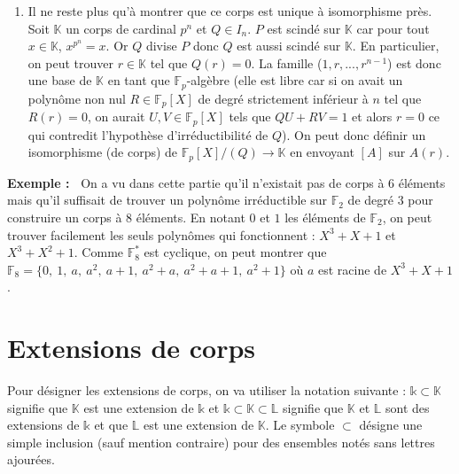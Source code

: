 \documentclass[5pt,a4paper]{article}
\newcommand{\ex}[1]{\textbf{Exemple :~} #1 \newline}
\begin{document}
\begin{onehalfspacing}
{\begin{enumerate}
\[\sum_{d=1}^{n-1}dm^{d-1} = \frac{1 + (n-1)m^n - nm^{n-1}}{(1-m)^2}\]
donc
\[p^n - \sum_{d=1}^{n-1}dp^{d-1} = \frac{n(p^n - p^{n-1}) + p^n((1-p^2) - 1) - 1}{(1-p)^2}\]
$p \geq 2$  car $p$ est premier donc $n(p^n - p^{n-1}) \geq 1$ et $p^n((1-p)^2 - 1) \geq 1$ (ce sont des entier strictement positifs). Alors, $\frac{1}{n}(p^n - \sum_{d=1}^{n}dp^{d-1}) > 0$ et donc $I_n$ est non-vide. Il existe bien un polynôme irréductible sur $\mathbb{F}_p$ de degré $n$ et, \textit{a fortiori}, un corps de cardinal $p^n$.
	\item Il ne reste plus qu'à montrer que ce corps est unique à isomorphisme près. Soit $\mathbb{K}$ un corps de cardinal $p^n$ et $Q \in I_n$. $P$ est scindé sur $\mathbb{K}$ car pour tout $x \in \mathbb{K}$, $x^{p^n} = x$. Or $Q$ divise $P$ donc $Q$ est aussi scindé sur $\mathbb{K}$. En particulier, on peut trouver $r \in \mathbb{K}$ tel que $Q(r) = 0$. La famille ($1, r, ..., r^{n-1}$) est donc une base de $\mathbb{K}$ en tant que $\mathbb{F}_p$-algèbre (elle est libre car si on avait un polynôme non nul $R \in \mathbb{F}_p[X]$ de degré strictement inférieur à $n$ tel que $R(r) = 0$, on aurait $U, V \in \mathbb{F}_p[X]$ tels que $QU + RV = 1$ et alors $r = 0$ ce qui contredit l'hypothèse d'irréductibilité de $Q$). On peut donc définir un isomorphisme (de corps) de $\mathbb{F}_p[X]/(Q) \rightarrow \mathbb{K}$ en envoyant $[A]$ sur $A(r)$.
	\end{enumerate}
}
\ex{On a vu dans cette partie qu'il n'existait pas de corps à $6$ éléments mais qu'il suffisait de trouver un polynôme irréductible sur $\mathbb{F}_2$ de degré $3$ pour construire un corps à $8$ éléments. En notant $0$ et $1$ les éléments de $\mathbb{F}_2$, on peut trouver facilement les seuls polynômes qui fonctionnent : $X^3 + X + 1$ et $X^3 + X^2 + 1$. Comme $\mathbb{F}_8^*$ est cyclique, on peut montrer que $\mathbb{F}_8 = \{0,~1,~a,~a^2,~a+1,~a^2 + a,~a^2 + a + 1,~a^2 + 1\}$ où $a$ est racine de $X^3 + X + 1$.}

\newpage
\section{Extensions de corps}
Pour désigner les extensions de corps, on va utiliser la notation suivante : $\mathds{k} \subset \mathbb{K}$ signifie que $\mathbb{K}$ est une extension de $\mathds{k}$ et $\mathds{k} \subset \mathbb{K} \subset \mathbb{L}$ signifie que $\mathbb{K}$ et $\mathbb{L}$ sont des extensions de $\mathds{k}$ et que $\mathbb{L}$ est une extension de $\mathbb{K}$. Le symbole $\subset$ désigne une simple inclusion (sauf mention contraire) pour des ensembles notés sans lettres ajourées.\newline



\end{onehalfspacing}
\end{document}

